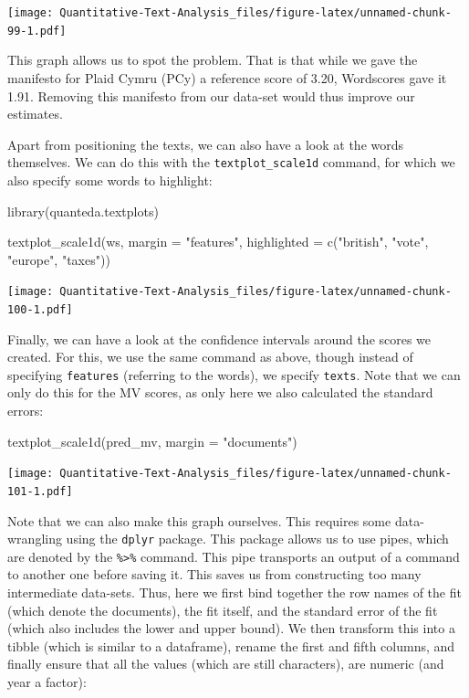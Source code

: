 \documentclass[
]{book}
\newenvironment{Shaded}{\begin{snugshade}}{\end{snugshade}}
\newcommand{\AttributeTok}[1]{\textcolor[rgb]{0.77,0.63,0.00}{#1}}
\newcommand{\FunctionTok}[1]{\textcolor[rgb]{0.00,0.00,0.00}{#1}}
\newcommand{\NormalTok}[1]{#1}
\newcommand{\StringTok}[1]{\textcolor[rgb]{0.31,0.60,0.02}{#1}}
\begin{document}
\texttt{[image: Quantitative-Text-Analysis\_files/figure-latex/unnamed-chunk-99-1.pdf]}

This graph allows us to spot the problem. That is that while we gave the manifesto for Plaid Cymru (PCy) a reference score of 3.20, Wordscores gave it 1.91. Removing this manifesto from our data-set would thus improve our estimates.

Apart from positioning the texts, we can also have a look at the words themselves. We can do this with the \texttt{textplot\_scale1d} command, for which we also specify some words to highlight:

\begin{Shaded}
\begin{Highlighting}[]
\FunctionTok{library}\NormalTok{(quanteda.textplots)}

\FunctionTok{textplot\_scale1d}\NormalTok{(ws, }\AttributeTok{margin =} \StringTok{"features"}\NormalTok{, }\AttributeTok{highlighted =} \FunctionTok{c}\NormalTok{(}\StringTok{"british"}\NormalTok{,}
    \StringTok{"vote"}\NormalTok{, }\StringTok{"europe"}\NormalTok{, }\StringTok{"taxes"}\NormalTok{))}
\end{Highlighting}
\end{Shaded}

\texttt{[image: Quantitative-Text-Analysis\_files/figure-latex/unnamed-chunk-100-1.pdf]}

Finally, we can have a look at the confidence intervals around the scores we created. For this, we use the same command as above, though instead of specifying \texttt{features} (referring to the words), we specify \texttt{texts}. Note that we can only do this for the MV scores, as only here we also calculated the standard errors:

\begin{Shaded}
\begin{Highlighting}[]
\FunctionTok{textplot\_scale1d}\NormalTok{(pred\_mv, }\AttributeTok{margin =} \StringTok{"documents"}\NormalTok{)}
\end{Highlighting}
\end{Shaded}

\texttt{[image: Quantitative-Text-Analysis\_files/figure-latex/unnamed-chunk-101-1.pdf]}

Note that we can also make this graph ourselves. This requires some data-wrangling using the \texttt{dplyr} package. This package allows us to use pipes, which are denoted by the \texttt{\%\textgreater{}\%} command. This pipe transports an output of a command to another one before saving it. This saves us from constructing too many intermediate data-sets. Thus, here we first bind together the row names of the fit (which denote the documents), the fit itself, and the standard error of the fit (which also includes the lower and upper bound). We then transform this into a tibble (which is similar to a dataframe), rename the first and fifth columns, and finally ensure that all the values (which are still characters), are numeric (and year a factor):
\end{document}
